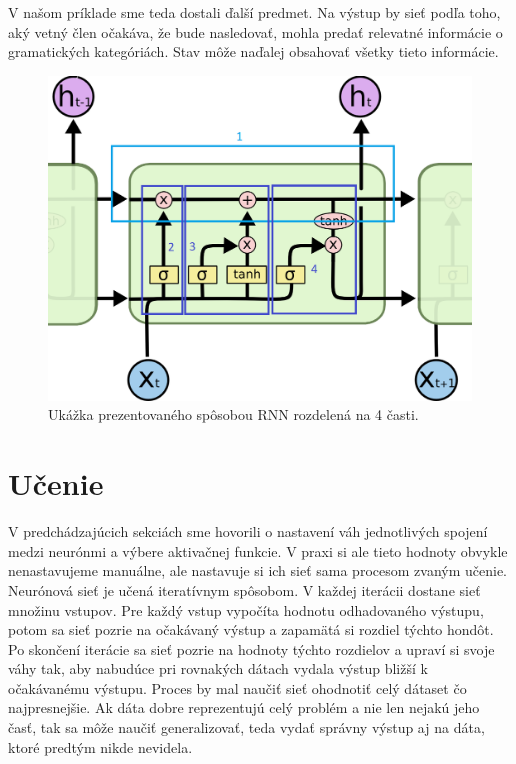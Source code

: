 V našom príklade sme teda dostali ďalší predmet. Na výstup by sieť podľa toho, aký vetný člen očakáva, že bude nasledovať, mohla predať relevatné informácie o gramatických kategóriách. Stav môže naďalej obsahovať všetky tieto informácie.
\begin{figure}
\includegraphics[width=\textwidth]{../img/lstm-close.png}
\caption{Ukážka prezentovaného spôsobou RNN rozdelená na 4 časti.}
\label{lstm:close}
\end{figure}

\section{Učenie}
V predchádzajúcich sekciách sme hovorili o nastavení váh jednotlivých spojení medzi neurónmi a výbere aktivačnej funkcie.
V praxi si ale tieto hodnoty obvykle nenastavujeme manuálne, ale nastavuje si ich sieť sama procesom zvaným učenie. Neurónová sieť je učená iteratívnym spôsobom. 
V každej iterácii dostane sieť množinu vstupov.
Pre každý vstup vypočíta hodnotu odhadovaného výstupu, potom sa sieť pozrie na očakávaný výstup a zapamätá si rozdiel týchto hondôt.
Po skončení iterácie sa sieť pozrie na hodnoty týchto rozdielov a upraví si svoje váhy tak, aby nabudúce pri rovnakých dátach vydala výstup bližší k očakávanému výstupu.
Proces by mal naučiť sieť ohodnotiť celý dátaset čo najpresnejšie.
Ak dáta dobre reprezentujú celý problém a nie len nejakú jeho časť, tak sa môže naučiť generalizovať, teda vydať správny výstup aj na dáta, ktoré predtým nikde nevidela.

